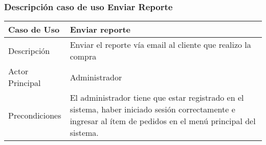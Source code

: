 \documentclass[12pt,a4paper]{article}
\begin{document}
    \newpage
\subsubsection*{Descripción caso de uso Enviar Reporte}
\begin{table}[h]
        \centering
        \begin{tabular}{| p{3cm}| p{11cm} |} 
        \hline  
        Caso de Uso         &    \textbf{Enviar reporte }   \\ 
        \hline
        Descripción         &  Enviar el reporte vía email al cliente que realizo la compra     \\ 
        \hline
        Actor Principal     &    Administrador  \\ 
        \hline
        Precondiciones      &    El administrador tiene que estar registrado en el sistema, haber iniciado sesión correctamente e ingresar al ítem de pedidos en el menú principal del sistema. 	\\
        \hline
        \end{tabular}
    \end{table}
    
\end{document}
